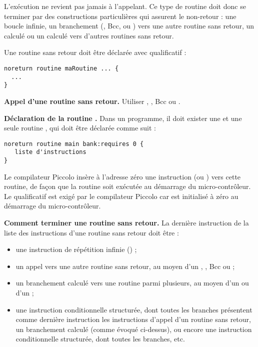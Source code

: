 L’exécution ne revient pas jamais à l’appelant. Ce type de routine doit donc se terminer par des constructions particulières qui assurent le non-retour : une boucle infinie, un branchement (, Bcc,  ou ) vers une autre routine sans retour, un  calculé ou un  calculé vers d’autres routines sans retour.

Une routine sans retour doit être déclarée avec qualificatif  :
\begin{lstlisting}[language=piccolo]
noreturn routine maRoutine ... {
  ...
}
\end{lstlisting}

\textbf{Appel d’une routine sans retour.} Utiliser , , Bcc ou .


\textbf{Déclaration de la routine .} Dans un programme, il doit exister une et une seule routine , qui doit être déclarée comme suit :

\begin{lstlisting}[language=piccolo]
noreturn routine main bank:requires 0 {
   liste d'instructions
}

\end{lstlisting}

Le compilateur Piccolo insère à l’adresse zéro une instruction  (ou ) vers cette routine, de façon que la routine  soit exécutée au démarrage du micro-contrôleur. Le qualificatif  est exigé par le compilateur Piccolo car  est initialisé à zéro au démarrage du micro-contrôleur.


\textbf{Comment terminer une routine sans retour.} La dernière instruction de la liste des instructions d’une routine sans retour doit être :
\begin{itemize}
  \item une instruction de répétition infinie () ;
  \item un appel vers une autre routine sans retour, au moyen d’un , , Bcc ou  ;
  \item un branchement calculé vers une routine parmi plusieurs, au moyen d’un  ou d’un  ;
  \item une instruction conditionnelle structurée, dont toutes les branches présentent comme dernière instruction les instructions d’appel d’un routine sans retour, un branchement calculé (comme évoqué ci-dessus), ou encore une instruction conditionnelle structurée, dont toutes les branches, etc.

\end{itemize}

